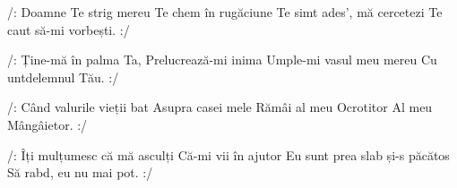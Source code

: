 
\beginverse
/: Doamne Te strig mereu
Te chem în rugăciune
Te simt ades’, mă cercetezi
Te caut să-mi vorbești. :/
\endverse

\beginchorus
/: Ține-mă în palma Ta,
Prelucrează-mi inima
Umple-mi vasul meu mereu
Cu untdelemnul Tău. :/
\endchorus

\beginverse
/: Când valurile vieții bat
Asupra casei mele
Rămâi al meu Ocrotitor
Al meu Mângâietor. :/
\endverse

\beginverse
/: Îți mulțumesc că mă asculți
Că-mi vii în ajutor
Eu sunt prea slab și-s păcătos
Să rabd, eu nu mai pot. :/
\endverse

\endsong